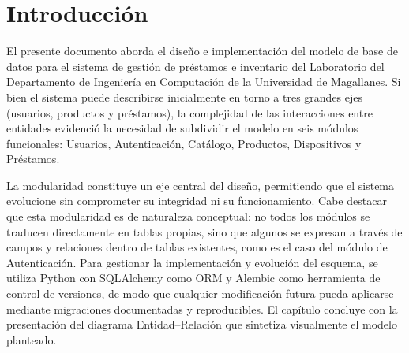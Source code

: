 \section{Introducción}

El presente documento aborda el diseño e implementación del modelo de base de datos 
para el sistema de gestión de préstamos e inventario del Laboratorio del Departamento 
de Ingeniería en Computación de la Universidad de Magallanes. Si bien el sistema puede 
describirse inicialmente en torno a tres grandes ejes (usuarios, productos y préstamos), 
la complejidad de las interacciones entre entidades evidenció la necesidad de subdividir 
el modelo en seis módulos funcionales: Usuarios, Autenticación, Catálogo, Productos, 
Dispositivos y Préstamos.

La modularidad constituye un eje central del diseño, permitiendo que el sistema evolucione 
sin comprometer su integridad ni su funcionamiento. Cabe destacar que esta modularidad es 
de naturaleza conceptual: no todos los módulos se traducen directamente en tablas propias, 
sino que algunos se expresan a través de campos y relaciones dentro de tablas existentes, 
como es el caso del módulo de Autenticación. Para gestionar la implementación y evolución 
del esquema, se utiliza Python con SQLAlchemy como ORM y Alembic como herramienta de 
control de versiones, de modo que cualquier modificación futura pueda aplicarse mediante 
migraciones documentadas y reproducibles. El capítulo concluye con la presentación del 
diagrama Entidad–Relación que sintetiza visualmente el modelo planteado.